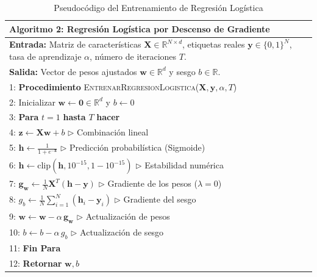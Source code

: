 \documentclass[twocolumn,10pt,journal]{IEEEtran}
\begin{document}
\begin{table}[h]
\centering
\caption{Pseudocódigo del Entrenamiento de Regresión Logística}
\label{alg:logreg}
\begin{tabular}{p{8cm}}
\toprule
\textbf{Algoritmo 2:} Regresión Logística por Descenso de Gradiente \\
\midrule
\textbf{Entrada:} Matriz de características $\mathbf{X} \in \mathbb{R}^{N \times d}$, etiquetas reales $\mathbf{y} \in \{0, 1\}^N$, tasa de aprendizaje $\alpha$, número de iteraciones $T$. \\
\textbf{Salida:} Vector de pesos ajustados $\mathbf{w} \in \mathbb{R}^d$ y sesgo $b \in \mathbb{R}$. \\
\midrule
1: \textbf{Procedimiento} \textsc{EntrenarRegresionLogistica}($\mathbf{X}, \mathbf{y}, \alpha, T$) \\
2: \quad Inicializar $\mathbf{w} \leftarrow \mathbf{0} \in \mathbb{R}^d$ y $b \leftarrow 0$ \\
3: \quad \textbf{Para} $t = 1$ \textbf{hasta} $T$ \textbf{hacer} \\
4: \quad \quad $\mathbf{z} \leftarrow \mathbf{X} \mathbf{w} + b$ \hfill $\triangleright$ Combinación lineal \\
5: \quad \quad $\mathbf{h} \leftarrow \frac{1}{1 + e^{-\mathbf{z}}}$ \hfill $\triangleright$ Predicción probabilística (Sigmoide) \\
6: \quad \quad $\mathbf{h} \leftarrow \text{clip}(\mathbf{h}, 10^{-15}, 1 - 10^{-15})$ \hfill $\triangleright$ Estabilidad numérica \\
7: \quad \quad $\mathbf{g}_{\mathbf{w}} \leftarrow \frac{1}{N} \mathbf{X}^T (\mathbf{h} - \mathbf{y})$ \hfill $\triangleright$ Gradiente de los pesos ($\lambda=0$) \\
8: \quad \quad $g_b \leftarrow \frac{1}{N} \sum_{i=1}^N (\mathbf{h}_i - \mathbf{y}_i)$ \hfill $\triangleright$ Gradiente del sesgo \\
9: \quad \quad $\mathbf{w} \leftarrow \mathbf{w} - \alpha \, \mathbf{g}_{\mathbf{w}}$ \hfill $\triangleright$ Actualización de pesos \\
10: \quad \quad $b \leftarrow b - \alpha \, g_b$ \hfill $\triangleright$ Actualización de sesgo \\
11: \quad \textbf{Fin Para} \\
12: \quad \textbf{Retornar} $\mathbf{w}, b$ \\
\bottomrule
\end{tabular}
\end{table}
\end{document}
